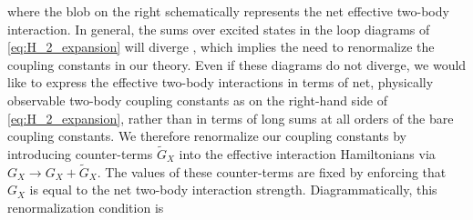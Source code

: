 \documentclass[preprint,showkeys,nofootinbib]{revtex4-1}
\newcommand{\1}{\mathds{1}}
\begin{document}
where the blob on the right schematically represents the net effective
two-body interaction.  In general, the sums over excited states in the
loop diagrams of \eqref{eq:H_2_expansion} will diverge
\cite{johnson2012effective}, which implies the need to renormalize the
coupling constants in our theory.  Even if these diagrams do not
diverge, we would like to express the effective two-body interactions
in terms of net, physically observable two-body coupling constants as
on the right-hand side of \eqref{eq:H_2_expansion}, rather than in
terms of long sums at all orders of the bare coupling constants.  We
therefore renormalize our coupling constants by introducing
counter-terms $\tilde G_X$ into the effective interaction Hamiltonians
via $G_X\to G_X+\tilde G_X$.  The values of these counter-terms are
fixed by enforcing that $G_X$ is equal to the net two-body interaction
strength.  Diagrammatically, this renormalization condition is
\end{document}

